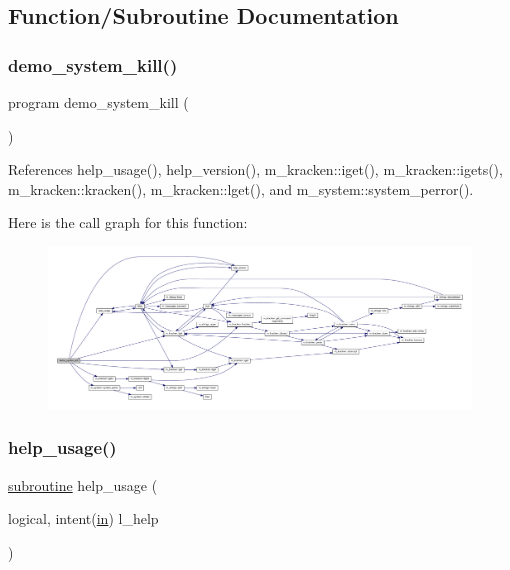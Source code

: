 \subsection{Function/\+Subroutine Documentation}
\mbox{\label{__kill_8f90_ad2550a0eb8119ef21d3febfe883f2051}} 
\subsubsection{\texorpdfstring{demo\+\_\+system\+\_\+kill()}{demo\_system\_kill()}}
{\footnotesize\ttfamily program demo\+\_\+system\+\_\+kill (\begin{DoxyParamCaption}{ }\end{DoxyParamCaption})}



References help\+\_\+usage(), help\+\_\+version(), m\+\_\+kracken\+::iget(), m\+\_\+kracken\+::igets(), m\+\_\+kracken\+::kracken(), m\+\_\+kracken\+::lget(), and m\+\_\+system\+::system\+\_\+perror().

Here is the call graph for this function\+:
\nopagebreak
\begin{figure}[H]
\begin{center}
\leavevmode
\includegraphics[width=350pt]{__kill_8f90_ad2550a0eb8119ef21d3febfe883f2051_cgraph}
\end{center}
\end{figure}
\mbox{\label{__kill_8f90_a3e09a3b52ee8fb04eeb93fe5761626a8}} 
\subsubsection{\texorpdfstring{help\+\_\+usage()}{help\_usage()}}
{\footnotesize\ttfamily \hyperlink{M__stopwatch_83_8txt_acfbcff50169d691ff02d4a123ed70482}{subroutine} help\+\_\+usage (\begin{DoxyParamCaption}\item[{logical, intent(\hyperlink{M__journal_83_8txt_afce72651d1eed785a2132bee863b2f38}{in})}]{l\+\_\+help }\end{DoxyParamCaption})}



